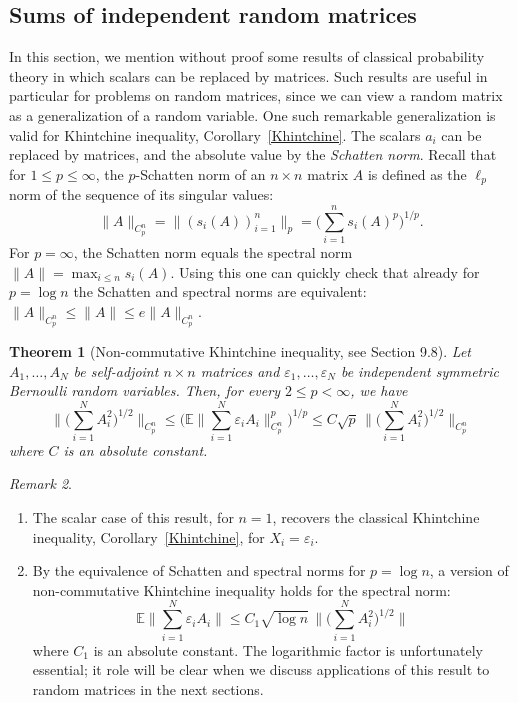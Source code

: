 \documentclass[10pt, openany]{book}
\newtheorem{theorem}{Theorem}[chapter]
\theoremstyle{remark}
\newtheorem{remark}[theorem]{Remark}
\def \E {\mathbb{E}}
\def \e {\varepsilon}
\begin{document}
\subsection{Sums of independent random matrices}				\label{s: sums matrices}

In this section, we mention without proof some results of classical probability theory 
in which scalars can be replaced by matrices. 
Such results are useful in particular for problems on random matrices,
since we can view a random matrix as a generalization of a random variable. 
One such remarkable generalization is valid for Khintchine inequality,
Corollary~\ref{Khintchine}. The scalars $a_i$ can be replaced by matrices, and the absolute value 
by the {\em Schatten norm}. 
Recall that for $1 \le p \le \infty$, the $p$-Schatten norm of an $n \times n$ matrix $A$ is defined as
the $\ell_p$ norm of the sequence of its singular values:  
$$
\|A\|_{C_p^n} = \| (s_i(A))_{i=1}^n\|_p = \big( \sum_{i=1}^n s_i(A)^p \big)^{1/p}.
$$
For $p=\infty$, the Schatten norm equals the spectral norm $\|A\| = \max_{i \le n} s_i(A)$. 
Using this one can quickly check that already for $p = \log n$ the Schatten and spectral 
norms are equivalent: $\|A\|_{C_p^n} \le \|A\| \le e \|A\|_{C_p^n}$.

\begin{theorem}[Non-commutative Khintchine inequality, see \cite{Pisier operator} Section 9.8]		
						\label{non-commutative Khintchine}
  \hfill Let $A_1, \ldots, A_N$ be self-adjoint $n \times n$ matrices and 
  $\e_1, \ldots, \e_N$ be independent symmetric Bernoulli random variables. 
  Then, for every $2 \le p < \infty$, we have
  $$
  \Big\| \Big( \sum_{i=1}^N A_i^2 \Big)^{1/2} \Big\|_{C_p^n}
  \le \Big( \E \Big\| \sum_{i=1}^N \e_i A_i \Big\|_{C_p^n}^p \Big)^{1/p}
  \le C \sqrt{p} \, \Big\| \Big( \sum_{i=1}^N A_i^2 \Big)^{1/2} \Big\|_{C_p^n}
  $$
  where $C$ is an absolute constant. 
\end{theorem}

\begin{remark}
\begin{enumerate}
  \item The scalar case of this result, for $n=1$, recovers the classical Khintchine inequality, 
  Corollary~\ref{Khintchine}, for $X_i = \e_i$.

  \item By the equivalence of Schatten and spectral norms for $p=\log n$, 
  a version of non-commutative Khintchine inequality holds for the spectral norm:
  \begin{equation}										\label{Khintchine operator norm}
  \E \Big\| \sum_{i=1}^N \e_i A_i \Big\|
  \le C_1 \sqrt{\log n} \, \Big\| \Big( \sum_{i=1}^N A_i^2 \Big)^{1/2} \Big\|
  \end{equation}
  where $C_1$ is an absolute constant. The logarithmic factor is unfortunately essential; 
  it role will be clear when we discuss applications of this result to random matrices in the next sections. 
\end{enumerate}
\end{remark}
\end{document}
